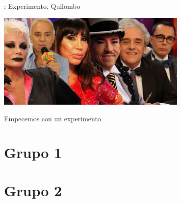 

\begin{frame}[fragile]{\shortt: Experimento, Quilombo}

\includegraphics[width=0.7\textwidth]{images/quilombo.jpg}
\bigskip

Empecemos con un experimento

\end{frame}


\section{Grupo 1}



\section{Grupo 2}


